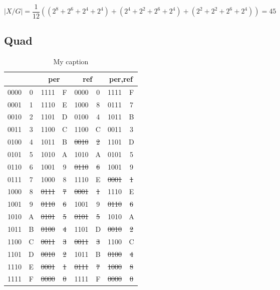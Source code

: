 \documentclass{ijuc}
\begin{document}
\[ |X/G| = \frac{1}{12} \left( (2^8 + 2^6 + 2^4 + 2^4) + (2^4 + 2^2 + 2^6 + 2^4) + (2^2 + 2^2 + 2^6 + 2^4) \right) = 45 \]

\subsection{Quad}

\begin{table}
\begin{center}
\begin{tabular}{cc|cc|cc|cc}
\multicolumn{2}{c|}{} & \multicolumn{2}{c|}{per} & \multicolumn{2}{c|}{ref} & \multicolumn{2}{c}{per,ref} \\ \hline
0000 & 0              &       1111  &       F    &       0000  &       0     &       1111  &       F        \\
0001 & 1              &       1110  &       E    &       1000  &       8     &       0111  &       7        \\
0010 & 2              &       1101  &       D    &       0100  &       4     &       1011  &       B        \\
0011 & 3              &       1100  &       C    &       1100  &       C     &       0011  &       3        \\
0100 & 4              &       1011  &       B    & \sout{0010} & \sout{2}    &       1101  &       D        \\
0101 & 5              &       1010  &       A    &       1010  &       A     &       0101  &       5        \\
0110 & 6              &       1001  &       9    & \sout{0110} & \sout{6}    &       1001  &       9        \\
0111 & 7              &       1000  &       8    &       1110  &       E     & \sout{0001} & \sout{1}       \\
1000 & 8              & \sout{0111} & \sout{7}   & \sout{0001} & \sout{1}    &       1110  &       E        \\
1001 & 9              & \sout{0110} & \sout{6}   &       1001  &       9     & \sout{0110} & \sout{6}       \\
1010 & A              & \sout{0101} & \sout{5}   & \sout{0101} & \sout{5}    &       1010  &       A        \\
1011 & B              & \sout{0100} & \sout{4}   &       1101  &       D     & \sout{0010} & \sout{2}       \\
1100 & C              & \sout{0011} & \sout{3}   & \sout{0011} & \sout{3}    &       1100  &       C        \\
1101 & D              & \sout{0010} & \sout{2}   &       1011  &       B     & \sout{0100} & \sout{4}       \\
1110 & E              & \sout{0001} & \sout{1}   & \sout{0111} & \sout{7}    & \sout{1000} & \sout{8}       \\
1111 & F              & \sout{0000} & \sout{0}   &       1111  &       F     & \sout{0000} & \sout{0}       \\
\end{tabular}
\end{center}
\caption{My caption}
\label{tbl-quad}
\end{table}
\end{document}
